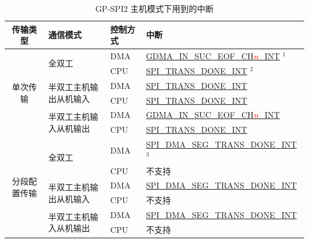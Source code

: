 \documentclass[main\_\_CN.tex]{subfiles}
\begin{document}
\begin{longtable}[c]{|c|l|l|l|}
\caption{GP-SPI2 主机模式下用到的中断}
\label{tab:spi-gp-spi2-master-interrupts}\\
\hline
\rowcolor{lightgray}
传输类型  & 通信模式 & 控制方式 & 中断 \\ \hline
\endhead
\multirow{6}{*}{单次传输} & \multirow{2}{*}{全双工} & DMA & \hyperref[int:GDMAINSUCEOFINT]{GDMA\_IN\_SUC\_EOF\_CH\textcolor{red}{\it{n}}\_INT} \hyperref[other:spi-item-gp-spi2-master-interrupts-note-1]{$^1$} \\ \cline{3-4}
&& CPU & \hyperref[int:SPITRANSDONEINT]{SPI\_TRANS\_DONE\_INT} \hyperref[other:spi-item-gp-spi2-master-interrupts-note-2]{$^2$}  \\ \cline{2-4}
& \multirow{2}{*}{半双工主机输出从机输入} & DMA & \hyperref[int:SPITRANSDONEINT]{SPI\_TRANS\_DONE\_INT} \\ \cline{3-4}
&& CPU & \hyperref[int:SPITRANSDONEINT]{SPI\_TRANS\_DONE\_INT}  \\ \cline{2-4}
& \multirow{2}{*}{半双工主机输入从机输出} & DMA & \hyperref[int:GDMAINSUCEOFINT]{GDMA\_IN\_SUC\_EOF\_CH\textcolor{red}{\it{n}}\_INT} \\ \cline{3-4}
&& CPU & \hyperref[int:SPITRANSDONEINT]{SPI\_TRANS\_DONE\_INT} \\ \hline
\multirow{6}{*}{分段配置传输} & \multirow{2}{*}{全双工} & DMA & \hyperref[int:SPIDMASEGTRANSDONEINT]{SPI\_DMA\_SEG\_TRANS\_DONE\_INT} \hyperref[other:spi-item-gp-spi2-master-interrupts-note-3]{$^3$} \\ \cline{3-4}
&& CPU & 不支持       \\ \cline{2-4}
& \multirow{2}{*}{半双工主机输出从机输入} & DMA  & \hyperref[int:SPIDMASEGTRANSDONEINT]{SPI\_DMA\_SEG\_TRANS\_DONE\_INT} \\ \cline{3-4}
&& CPU           & 不支持       \\ \cline{2-4}
& \multirow{2}{*}{半双工主机输入从机输出} & DMA & \hyperref[int:SPIDMASEGTRANSDONEINT]{SPI\_DMA\_SEG\_TRANS\_DONE\_INT} \\ \cline{3-4}
&& CPU & 不支持       \\ \hline
\end{longtable}
\end{document}
